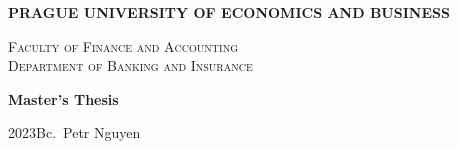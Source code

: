 \documentclass [a4paper,12pt]{report}
\def \BookName {Master's Thesis}
\def \AutorDP {Bc.\ Petr Nguyen}
\def \Year {2023}
\def \VSE {PRAGUE UNIVERSITY OF ECONOMICS AND BUSINESS}
\def \FFU {Faculty of Finance and Accounting}
\def \BAP {Department of Banking and Insurance}
\begin{document}
\pagestyle{empty}

    \begin{center}
      \begin{doublespacing}
    {\LARGE \textbf{\VSE}}\\[2ex]
      \end{doublespacing}
    {\LARGE \textsc{\FFU}}\\[1ex]
 	  {\large \textsc{\BAP}}

		\vspace{8.47cm}
		
    {\Huge \textbf{\BookName} \\[4ex]

    }

    \vfill

    {\Large \Year \hfill \AutorDP}\\[6ex]

    \newpage
    \end{center}
\end{document}
